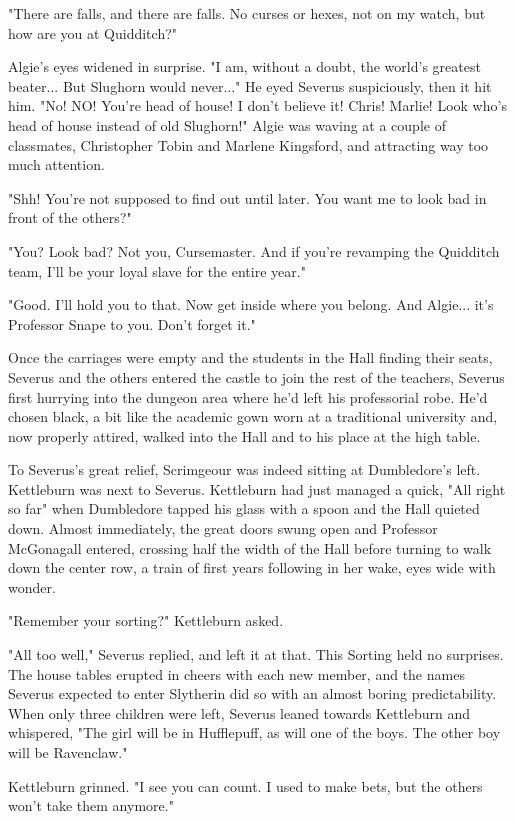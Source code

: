 \documentclass[a4paper,11pt]{article}
\begin{document}
"There are falls, and there are falls. No curses or hexes, not on my watch, but how are you at Quidditch?"

Algie's eyes widened in surprise. "I am, without a doubt, the world's greatest beater... But Slughorn would never..." He eyed Severus suspiciously, then it hit him. "No! NO! You're head of house! I don't believe it! Chris! Marlie! Look who's head of house instead of old Slughorn!" Algie was waving at a couple of classmates, Christopher Tobin and Marlene Kingsford, and attracting way too much attention.

"Shh! You're not supposed to find out until later. You want me to look bad in front of the others?"

"You? Look bad? Not you, Cursemaster. And if you're revamping the Quidditch team, I'll be your loyal slave for the entire year."

"Good. I'll hold you to that. Now get inside where you belong. And Algie... it's Professor Snape to you. Don't forget it."

Once the carriages were empty and the students in the Hall finding their seats, Severus and the others entered the castle to join the rest of the teachers, Severus first hurrying into the dungeon area where he'd left his professorial robe. He'd chosen black, a bit like the academic gown worn at a traditional university and, now properly attired, walked into the Hall and to his place at the high table.

To Severus's great relief, Scrimgeour was indeed sitting at Dumbledore's left. Kettleburn was next to Severus. Kettleburn had just managed a quick, "All right so far" when Dumbledore tapped his glass with a spoon and the Hall quieted down. Almost immediately, the great doors swung open and Professor McGonagall entered, crossing half the width of the Hall before turning to walk down the center row, a train of first years following in her wake, eyes wide with wonder.

"Remember your sorting?" Kettleburn asked.

"All too well," Severus replied, and left it at that. This Sorting held no surprises. The house tables erupted in cheers with each new member, and the names Severus expected to enter Slytherin did so with an almost boring predictability. When only three children were left, Severus leaned towards Kettleburn and whispered, "The girl will be in Hufflepuff, as will one of the boys. The other boy will be Ravenclaw."

Kettleburn grinned. "I see you can count. I used to make bets, but the others won't take them anymore."
\end{document}
